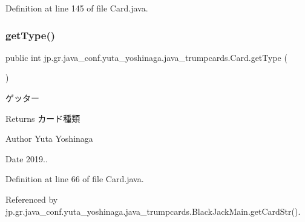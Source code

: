 Definition at line 145 of file Card.\+java.

\mbox{\label{classjp_1_1gr_1_1java__conf_1_1yuta__yoshinaga_1_1java__trumpcards_1_1_card_a5e3f4e60a101867dfed9db97f417465d}} 
\subsubsection{\texorpdfstring{get\+Type()}{getType()}}
{\footnotesize\ttfamily public int jp.\+gr.\+java\+\_\+conf.\+yuta\+\_\+yoshinaga.\+java\+\_\+trumpcards.\+Card.\+get\+Type (\begin{DoxyParamCaption}{ }\end{DoxyParamCaption})}



ゲッター 

\begin{DoxyReturn}{Returns}
カード種類 
\end{DoxyReturn}
\begin{DoxyAuthor}{Author}
Yuta Yoshinaga 
\end{DoxyAuthor}
\begin{DoxyDate}{Date}
2019.. 
\end{DoxyDate}


Definition at line 66 of file Card.\+java.



Referenced by jp.\+gr.\+java\+\_\+conf.\+yuta\+\_\+yoshinaga.\+java\+\_\+trumpcards.\+Black\+Jack\+Main.\+get\+Card\+Str().

